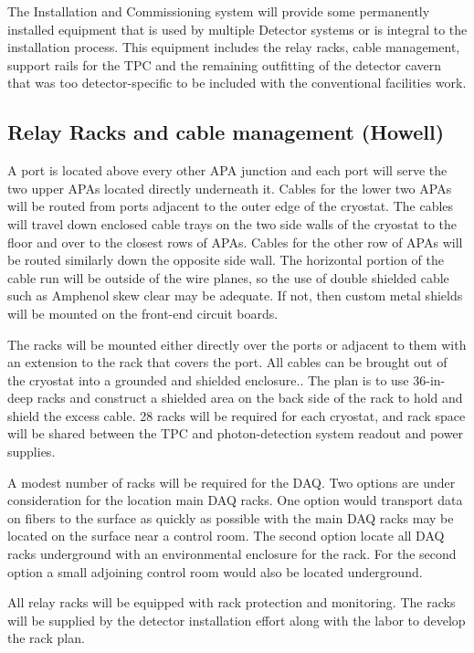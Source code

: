 The Installation and Commissioning system will provide some permanently installed equipment that is 
used by multiple Detector systems or is integral to the installation process.  This equipment includes the 
relay racks, cable management, support rails for the TPC and the remaining outfitting of the detector 
cavern that was too detector-specific to be included with the conventional facilities work.

\subsection{Relay Racks and cable management (Howell)}
\label{fd:install:integ:racks}

A port is located above every other APA junction and each port will serve the two upper APAs located directly underneath it. Cables for the lower two APAs will be routed from ports adjacent to the outer edge 
of the cryostat.  The cables will travel down enclosed cable trays on the two side walls of the cryostat to the floor and over to the closest rows of APAs.  Cables for the other row of APAs will be routed similarly 
down the opposite side wall.  The horizontal portion of the cable run will be outside of the wire planes, so the use of double shielded cable such as Amphenol skew clear may be adequate. If not, then custom metal shields will be mounted on the front-end circuit boards. 

The racks will be mounted either directly over the ports or adjacent to them with an extension to the rack that covers the port. All cables can be brought out of the cryostat into a grounded and shielded 
enclosure.. The plan is to use 36-in-deep racks and construct a shielded area on the back side of the rack to hold and shield the excess cable. 28 racks will be required for each cryostat, and rack space will be shared between the TPC and photon-detection system readout and power supplies. 

A modest number of racks will be required for the DAQ. Two options are under consideration for the location main DAQ racks. One option would transport data on fibers to the surface as quickly as possible 
with the main DAQ racks may be located on the surface near a control room. The second option locate all DAQ racks underground with an environmental enclosure for the rack. For the second option a small adjoining control room would also be located underground.

All relay racks will be equipped with rack protection and monitoring. The racks will be supplied by the 
detector installation effort along with the labor to develop the rack plan.


